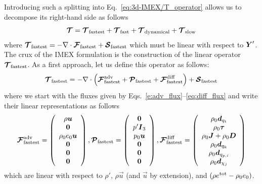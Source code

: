 \documentclass{article}
\begin{document}
 Introducing such a splitting into Eq.\ \eqref{eq:3d-IMEX/T_operator} allows us to decompose its right-hand side as follows
 \[
\boldsymbol{{\mathcal{T}}}= \boldsymbol{{\mathcal{T}}}_{\mathrm{fastest}} + \boldsymbol{{\mathcal{T}}}_{\mathrm{fast}} + \boldsymbol{{\mathcal{T}}}_{\mathrm{dynamical}} + \boldsymbol{{\mathcal{T}}}_{\mathrm{slow}}
\]
where $\boldsymbol{{\mathcal{T}}}_{\mathrm{fastest}}=-\nabla \cdot \boldsymbol{{\mathcal{F}}}_{\mathrm{fastest}} + \boldsymbol{{\mathcal{S}}}_{\mathrm{fastest}}$
 which must be linear with respect to $\boldsymbol{{Y}}'$. 
 The crux of the IMEX formulation is the construction of the linear operator $\boldsymbol{{\mathcal{T}}}_{\mathrm{fastest}}$.  As a first approach, let us define this operator as follows:
 \[
 \boldsymbol{{\mathcal{T}}}_{\mathrm{fastest}}=-\nabla \cdot \left( \boldsymbol{{\mathcal{F}}}^{\mathrm{adv}}_{\mathrm{fastest}} + \boldsymbol{{\mathcal{P}}}_{\mathrm{fastest}} + \boldsymbol{{\mathcal{F}}}^{\mathrm{diff}}_{\mathrm{fastest}} \right) + \boldsymbol{{\mathcal{S}}}_{\mathrm{fastest}}
 \]
 where we start with the fluxes given by Eqs.\ \eqref{e:adv_flux}--\eqref{eq:diff_flux} and write their linear representations as follows
 \begin{equation}
 \boldsymbol{{\mathcal{F}}}^{\mathrm{adv}}_{\mathrm{fastest}}=\left( \begin{array}{c}
 \rho \boldsymbol{{u}} \\
 \boldsymbol{{0}} \\
 \rho_0 e_0 \boldsymbol{{u}}\\
\boldsymbol{{0}}\\
\boldsymbol{{0}} \\
\boldsymbol{{0}}
\end{array}
\right), 
\boldsymbol{{\mathcal{P}}}_{\mathrm{fastest}}= \left( \begin{array}{c}
\boldsymbol{{0}} \\
p' \boldsymbol{{I}}_3 \\
p_0 \boldsymbol{{u}}\\
\boldsymbol{{0}} \\
\boldsymbol{{0}} \\
\boldsymbol{{0}} 
\end{array}
\right),
\boldsymbol{{\mathcal{F}}}^{\mathrm{diff}}_{\mathrm{fastest}}=\left( \begin{array}{c}
 \rho_0 \boldsymbol{{d}}_{q_t} \\
 \rho_0 \boldsymbol{{\tau}}\\
 \rho_0 \boldsymbol{{J}} + \rho_0 \boldsymbol{{D}} \\
\rho_0 \boldsymbol{{d}}_{q_k}\\
\rho_0 \boldsymbol{{d}}_{q_{p, i}}\\
\rho_0 \boldsymbol{{d}}_{\chi_j}
\end{array}
\right)
\label{eq:fluxes_linear}
\end{equation}
which are linear with respect to $\rho'$, $\rho \vec{u}$ (and $\vec{u}$ by extension), and $(\rho e^{\mathrm{tot}} - \rho_0 e_0)$.
\end{document}
